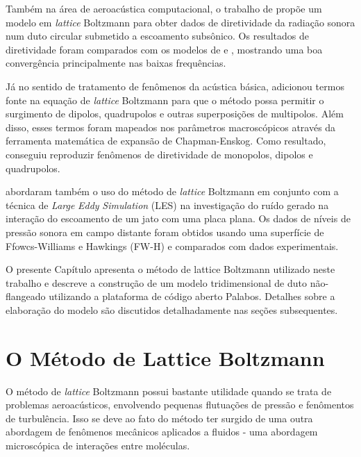 Também na área de aeroacústica computacional, o trabalho de  propõe um modelo em \textit{lattice} Boltzmann para obter dados de diretividade da radiação sonora num duto circular submetido a escoamento subsônico. Os resultados de diretividade foram comparados com os modelos de  e , mostrando uma boa convergência principalmente nas baixas frequências.

Já no sentido de tratamento de fenômenos da acústica básica,  adicionou termos fonte na equação de \textit{lattice} Boltzmann para que o método possa permitir o surgimento de dipolos, quadrupolos e outras superposições de multipolos. Além disso, esses termos foram mapeados nos parâmetros macroscópicos através da ferramenta matemática de expansão de Chapman-Enskog. Como resultado, conseguiu reproduzir fenômenos de diretividade de monopolos, dipolos e quadrupolos.

 abordaram também o uso do método de \textit{lattice} Boltzmann em conjunto com a técnica de \textit{Large} \textit{Eddy} \textit{Simulation} (LES) na investigação do ruído gerado na interação do escoamento de um jato com uma placa plana. Os dados de níveis de pressão sonora em campo distante foram obtidos usando uma superfície de Ffowcs-Williams e Hawkings (FW-H) e comparados com dados experimentais.

O presente Capítulo apresenta o método de lattice Boltzmann utilizado neste trabalho e descreve a construção de um modelo tridimensional de duto não-flangeado utilizando a plataforma de código aberto Palabos. Detalhes sobre a elaboração do modelo são discutidos detalhadamente nas seções subsequentes.

\section{O Método de Lattice Boltzmann}

O método de \textit{lattice} Boltzmann possui bastante utilidade quando se trata de problemas aeroacústicos, envolvendo pequenas flutuações de pressão e fenômentos de turbulência. Isso se deve ao fato do método ter surgido de uma outra abordagem de fenômenos mecânicos aplicados a fluidos - uma abordagem microscópica de interações entre moléculas.

